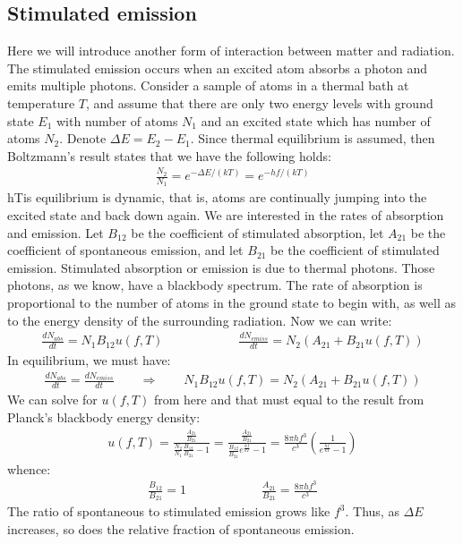 \documentclass[11pt]{article}
\theoremstyle{break}
\theoremstyle{break}
\begin{document}
\subsection{Stimulated emission}
Here we will introduce another form of interaction between matter and radiation. The stimulated emission occurs when an excited atom absorbs a photon and emits multiple photons. Consider a sample of atoms in a thermal bath at temperature $T$, and assume that there are only two energy levels with ground state $E_1$ with number of atoms $N_1$ and an excited state which has number of atoms $N_2$. Denote $\Delta E = E_2 - E_1$. Since thermal equilibrium is assumed, then Boltzmann's result states that we have the following holds:
\begin{align*}
\frac{N_2}{N_1} = e^{-\Delta E/(kT)} = e^{-hf/(kT)}
\end{align*}
hTis equilibrium is dynamic, that is, atoms are continually jumping into the excited state and back down again. We are interested in the rates of absorption and emission. Let $B_{12}$ be the coefficient of stimulated absorption, let $A_{21}$ be the coefficient of spontaneous emission, and let $B_{21}$ be the coefficient of stimulated emission. Stimulated absorption or emission is due to thermal photons. Those photons, as we know, have a blackbody spectrum. The rate of absorption is proportional to the number of atoms in the ground state to begin with, as well as to the energy density of the surrounding radiation. Now we can write:
\begin{align*}
\frac{dN_{abs}}{dt} = N_1 B_{12} u(f,T) \qquad\qquad\qquad \frac{dN_{emiss}}{dt} = N_2(A_{21} + B_{21}u(f,T))
\end{align*}
In equilibrium, we must have:
\begin{align*}
\frac{dN_{abs}}{dt} = \frac{dN_{emiss}}{dt} \qquad \Rightarrow \qquad N_1 B_{12} u(f,T) =N_2(A_{21} + B_{21}u(f,T))
\end{align*}
We can solve for $u(f,T)$ from here and that must equal to the result from Planck's blackbody energy density:
\begin{align*}
u(f,T) = \frac{\frac{A_{21}}{B_{21}}}{\frac{N_2}{N_1}\frac{B_{12}}{B_{21}}-1} = \frac{\frac{A_{21}}{B_{21}}}{\frac{B_{12}}{B_{21}}e^{\frac{hf}{kT}}-1} = \frac{8\pi hf^3}{c^3}\left( \frac{1}{e^{\frac{hf}{kT}}-1}\right)
\end{align*}
whence:
\begin{align*}
\frac{B_{12}}{B_{21}} = 1 \qquad \qquad \qquad \frac{A_{21}}{B_{21}} = \frac{8\pi hf^3}{c^3}
\end{align*}
The ratio of spontaneous to stimulated emission grows like $f^3$. Thus, as $\Delta E$ increases, so does the relative fraction of spontaneous emission.\\
\end{document}
